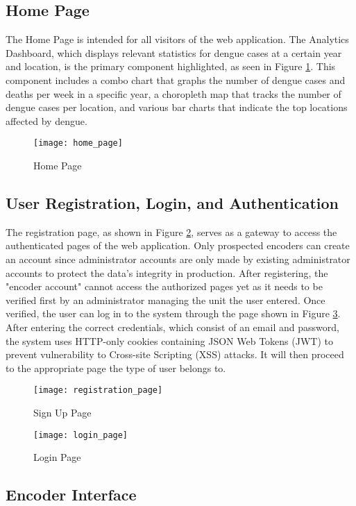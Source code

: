 \subsection{Home Page}
The Home Page is intended for all visitors of the web application. The Analytics Dashboard, which displays relevant statistics for dengue cases at a certain year and location, is the primary component highlighted, as seen in Figure \ref{fig:home_page}. This component includes a combo chart that graphs the number of dengue cases and deaths per week in a specific year, a choropleth map that tracks the number of dengue cases per location, and various bar charts that indicate the top locations affected by dengue. 
\begin{figure}[H]
	\centering
	\texttt{[image: home\_page]}
	\caption{Home Page}
	\label{fig:home_page}
\end{figure}

\subsection{User Registration, Login, and Authentication}
The registration page, as shown in Figure \ref{fig:registration_page}, serves as a gateway to access the authenticated pages of the web application. Only prospected encoders can create an account since administrator accounts are only made by existing administrator accounts to protect the data's integrity in production. After registering, the "encoder account" cannot access the authorized pages yet as it needs to be verified first by an administrator managing the unit the user entered. Once verified, the user can log in to the system through the page shown in Figure \ref{fig:login_page}. After entering the correct credentials, which consist of an email and password, the system uses HTTP-only cookies containing JSON Web Tokens (JWT) to prevent vulnerability to Cross-site Scripting (XSS) attacks. It will then proceed to the appropriate page the type of user belongs to. 
\begin{figure}[H]
	\centering
	\texttt{[image: registration\_page]}
	\caption{Sign Up Page}
	\label{fig:registration_page}
\end{figure}

\begin{figure}[H]
	\centering
	\texttt{[image: login\_page]}
	\caption{Login Page}
	\label{fig:login_page}
\end{figure}

\subsection{Encoder Interface}
